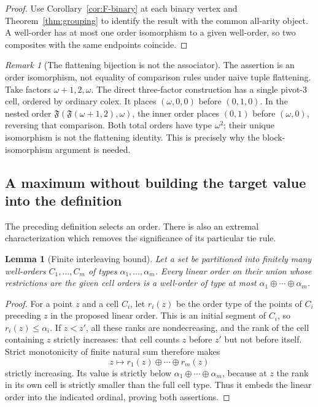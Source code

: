 \documentclass[11pt,letterpaper]{article}
\newtheorem{lemma}[theorem]{Lemma}
\theoremstyle{definition}
\theoremstyle{remark}
\newtheorem{remark}[theorem]{Remark}
\newcommand{\FF}{\mathfrak F}
\begin{document}
\begin{proof}
Use Corollary~\ref{cor:F-binary} at each binary vertex and
Theorem~\ref{thm:grouping} to identify the result with the common
all-arity object. A well-order has at most one order isomorphism to a
given well-order, so two composites with the same endpoints coincide.
\end{proof}

\begin{remark}[The flattening bijection is not the associator]\label{rem:flatten}
The assertion is an order isomorphism, not equality of comparison rules
under naive tuple flattening. Take factors $\omega+1,2,\omega$. The
direct three-factor construction has a single pivot-$3$ cell, ordered by
ordinary colex. It places $(\omega,0,0)$ before $(0,1,0)$. In the nested
order $\FF(\FF(\omega+1,2),\omega)$, the inner order places $(0,1)$
before $(\omega,0)$, reversing that comparison. Both total orders have
type $\omega^2$; their unique isomorphism is not the flattening identity.
This is precisely why the block-isomorphism argument is needed.
\end{remark}

\subsection{A maximum without building the target value into the definition}

The preceding definition selects an order. There is also an extremal
characterization which removes the significance of its particular tie
rule.

\begin{lemma}[Finite interleaving bound]\label{lem:shuffle}
Let a set be partitioned into finitely many well-orders $C_1,\ldots,C_m$
of types $\alpha_1,\ldots,\alpha_m$. Every linear order on their union
whose restrictions are the given cell orders is a well-order of type at
most $\alpha_1\oplus\cdots\oplus\alpha_m$.
\end{lemma}

\begin{proof}
For a point $z$ and a cell $C_i$, let $r_i(z)$ be the order type of the
points of $C_i$ preceding $z$ in the proposed linear order. This is an
initial segment of $C_i$, so $r_i(z)\leq\alpha_i$. If $z<z'$, all these
ranks are nondecreasing, and the rank of the cell containing $z$ strictly
increases: that cell counts $z$ before $z'$ but not before itself.
Strict monotonicity of finite natural sum therefore makes
\[
 z\longmapsto r_1(z)\oplus\cdots\oplus r_m(z)
\]
strictly increasing. Its value is strictly below
$\alpha_1\oplus\cdots\oplus\alpha_m$, because at $z$ the rank in its
own cell is strictly smaller than the full cell type. Thus it embeds the
linear order into the indicated ordinal, proving both assertions.
\end{proof}
\end{document}
